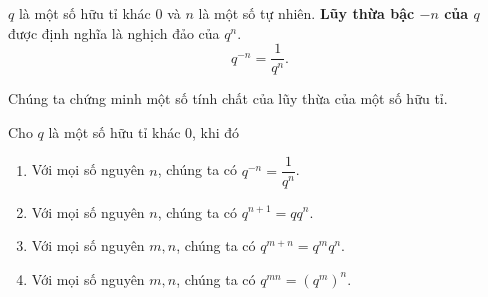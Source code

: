 \begin{definition}
    $q$ là một số hữu tỉ khác $0$ và $n$ là một số tự nhiên. \textbf{Lũy thừa bậc $-n$ của $q$} được định nghĩa là nghịch đảo của $q^{n}$.
    \[
        q^{-n} = \frac{1}{q^{n}}.
    \]
\end{definition}

Chúng ta chứng minh một số tính chất của lũy thừa của một số hữu tỉ.
\begin{theorem}
    Cho $q$ là một số hữu tỉ khác $0$, khi đó
    \begin{enumerate}[label={(\roman*)}]
        \item Với mọi số nguyên $n$, chúng ta có $q^{-n} = \dfrac{1}{q^{n}}$.
        \item Với mọi số nguyên $n$, chúng ta có $q^{n+1} = qq^{n}$.
        \item Với mọi số nguyên $m, n$, chúng ta có $q^{m + n} = q^{m}q^{n}$.
        \item Với mọi số nguyên $m, n$, chúng ta có $q^{mn} = {(q^{m})}^{n}$.
    \end{enumerate}
\end{theorem}

